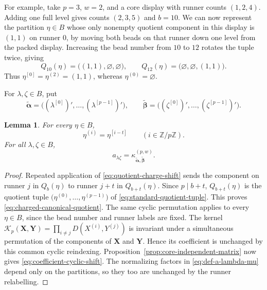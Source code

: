 \documentclass[12pt,reqno,a4paper]{amsart}
\numberwithin{equation}{section}
\numberwithin{figure}{section}
\theoremstyle{plain}
\newtheorem{lemma}[theorem]{Lemma}
\theoremstyle{definition}
\newcommand{\emptypar}{\varnothing}
\begin{document}
For example, take $p=3$, $w=2$, and a core display with runner counts
$(1,2,4)$.  Adding one full level gives counts $(2,3,5)$ and $b=10$.
We can now represent the partition $\eta\in B$ whose only nonempty
quotient component in this display is $(1,1)$ on runner $0$, by
moving both beads on that runner down one level from the packed display.
Increasing the bead number from $10$ to $12$ rotates the tuple twice, giving
\[
 Q_{10}(\eta)=\bigl((1,1),\emptypar,\emptypar\bigr),\qquad
 Q_{12}(\eta)=\bigl(\emptypar,\emptypar,(1,1)\bigr).
\]
Thus $\eta^{[0]}=\eta^{(2)}=(1,1)$, whereas $\eta^{(0)}=\emptypar$.

For $\lambda,\zeta\in B$, put
\[
 \widetilde{\boldsymbol\alpha}
 =\bigl((\lambda^{[0]})',\ldots,(\lambda^{[p-1]})'\bigr),\qquad
 \widetilde{\boldsymbol\beta}
 =\bigl((\zeta^{[0]})',\ldots,(\zeta^{[p-1]})'\bigr).
\]

\begin{samepage}
\begin{lemma}
\label{lem:change-bead-number}
For every $\eta\in B$,
\begin{equation}\label{eq:charged-canonical-quotient}
 \eta^{(i)}=\eta^{[i-t]}\qquad(i\in\mathbb Z/p\mathbb Z).
\end{equation}
For all $\lambda,\zeta\in B$,
\begin{equation}\label{eq:coefficient-cyclic-shift}
 a_{\lambda\zeta}
 =\kappa^{(p,w)}_{\widetilde{\boldsymbol\alpha},\widetilde{\boldsymbol\beta}}.
\end{equation}
\end{lemma}
\end{samepage}

\begin{proof}
Repeated application of \eqref{eq:quotient-charge-shift} sends the
component on runner $j$ in $Q_b(\eta)$ to runner $j+t$ in
$Q_{b+t}(\eta)$.  Since $p\mid b+t$, $Q_{b+t}(\eta)$ is the quotient tuple
$\bigl(\eta^{(0)},\ldots,\eta^{(p-1)}\bigr)$ of
\eqref{eq:standard-quotient-tuple}.  This proves
\eqref{eq:charged-canonical-quotient}.  The same cyclic permutation
applies to every $\eta\in B$, since the bead number and runner labels
are fixed.
The kernel
$\mathcal K_p(\mathbf X,\mathbf Y)
=\prod_{i\neq j}D(X^{(i)},Y^{(j)})$
is invariant under a simultaneous permutation of the components of
$\mathbf X$ and $\mathbf Y$.  Hence its coefficient is unchanged by this common
cyclic reindexing.  Proposition~\ref{prop:core-independent-matrix}
now gives \eqref{eq:coefficient-cyclic-shift}.  The normalizing
factors in \eqref{eq:def-a-lambda-mu} depend only on the partitions,
so they too are unchanged by the runner relabelling.
\end{proof}
\end{document}
